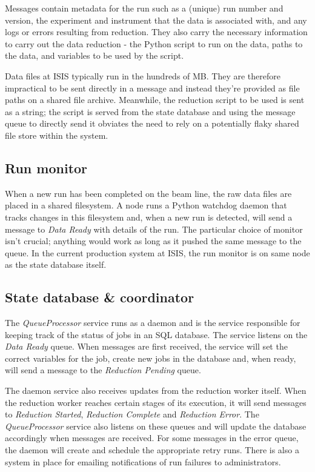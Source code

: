 \documentclass[twocolumn]{article}
\begin{document}
Messages contain metadata for the run such as a (unique) run number and
version, the experiment and instrument that the data is associated with,
and any logs or errors resulting from reduction. They also carry the
necessary information to carry out the data reduction - the Python
script to run on the data, paths to the data, and variables to be used
by the script.

Data files at ISIS typically run in the hundreds of MB. They are therefore 
impractical to be sent directly in a message and instead they're provided as file
paths on a shared file archive. Meanwhile, the reduction script to be
used is sent as a string; the script is served from the state database
and using the message queue to directly send it obviates the need to
rely on a potentially flaky shared file store within the system.

\subsection{Run monitor}\label{run-monitor}

When a new run has been completed on the beam line, the raw data files are
placed in a shared filesystem. A node runs a Python watchdog daemon that
tracks changes in this filesystem and, when a new run is detected, will send a
message to \emph{Data Ready} with details of the run. The particular
choice of monitor isn't crucial; anything would work as long as it
pushed the same message to the queue. In the current production system
at ISIS, the run monitor is on same node as the state database itself.

\subsection{State database \& coordinator}\label{state-database}

The \emph{QueueProcessor} service runs as a daemon and is the service responsible
for keeping track of the status of jobs in an SQL database. The service
listens on the \emph{Data Ready} queue. When messages are first received,
the service will set the correct variables for the job, create new jobs in 
the database and, when ready, will send a message to the \emph{Reduction Pending} queue.

The daemon service also receives updates from the reduction worker itself. When the 
reduction worker reaches certain stages of its execution, it will send messages to
\emph{Reduction Started}, \emph{Reduction Complete} and \emph{Reduction Error}.
The \emph{QueueProcessor} service also listens on these queues and will update the database
accordingly when messages are received. For some messages in the error queue, the daemon 
will create and schedule the appropriate retry runs. There is also a system in place for 
emailing notifications of run failures to administrators. 
\end{document}
